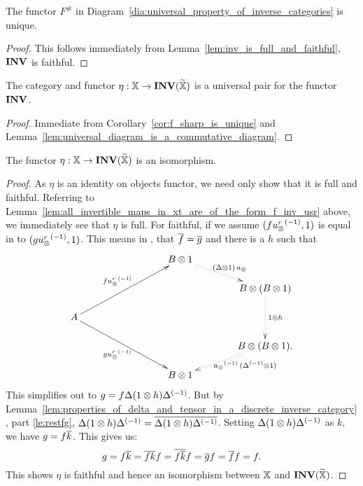 \begin{corollary}\label{cor:f_sharp_is_unique}
  The functor $F^{\#}$ in Diagram~\ref{dia:universal_property_of_inverse_categories} is unique.
\end{corollary}
\begin{proof}
  This follows immediately from Lemma~\ref{lem:inv_is_full_and_faithful}, $\mathbf{INV}$ is faithful.
\end{proof}
\begin{corollary}\label{cor:eta_and_xt_are_universal_for_inv}
  The category \Xt and functor $\eta:\mathbb{X}\to \mathbf{INV}({\widetilde{\mathbb{X}}})$ is a universal pair for the functor $\mathbf{INV}$.
\end{corollary}
\begin{proof}
  Immediate from Corollary~\ref{cor:f_sharp_is_unique} and Lemma~\ref{lem:universal_diagram_is_a_commutative_diagram}.
\end{proof}

\begin{lemma}\label{lem:the_functor_eta_is_an_isomorphism}
  The functor $\eta:\mathbb{X} \to \mathbf{INV}({\widetilde{\mathbb{X}}})$ is an isomorphism.
\end{lemma}
\begin{proof}
  As $\eta$ is an identity on objects functor, we need only show that it is full and faithful.
  Referring to Lemma~\ref{lem:all_invertible_maps_in_xt_are_of_the_form_f_inv_usr} above, we
  immediately see that $\eta$ is full. For faithful, if we assume $(f{u_{\otimes}^r}^{(-1)},1)$ is equal in \Xt
  to $(g{u_{\otimes}^r}^{(-1)},1)$. This means in \X, that $\overline{f} = \overline{g}$ and there is a $h$ such that
  \[
    \xymatrix @C=40pt @R=15pt{
      & & B \* 1 \ar@{.>}[dr]^{(\Delta\* 1) \, a_{\*}}\\
      && & B \* (B\* 1) \ar@{.>}[dd]^{1\* h} \\
      A \ar[uurr]^{f\inv{\usr}} \ar[ddrr]_{g\inv{\usr}}&&&\\
      && & B \* (B \* 1). \ar@{.>}[dl]^(.4){\ \inv{a_{\*}}\,(\inv{\Delta}\* 1)}\\
      && B\* 1
    }
  \]
  This simplifies out to $g = f \Delta (1\otimes h) {\Delta}^{(-1)}$. But by
  Lemma~\ref{lem:properties_of_delta_and_tensor_in_a_discrete_inverse_category}, part \ref{le:restfg},
  $\Delta (1\otimes h) {\Delta}^{(-1)} = \overline{\Delta (1\otimes h) {\Delta}^{(-1)}}$. Setting $\Delta (1\otimes h)
  {\Delta}^{(-1)}$ as $k$, we have $g = f \overline{k}$. This gives us:
  \[
    g = f \overline{k} = \overline{f k} f = \overline{f \overline{k}} f = \overline{g} f = \overline{f} f = f.
  \]
  This shows $\eta$ is faithful and hence an isomorphism between $\mathbb{X}$ and $\mathbf{INV}({\widetilde{\mathbb{X}}})$.
\end{proof}

